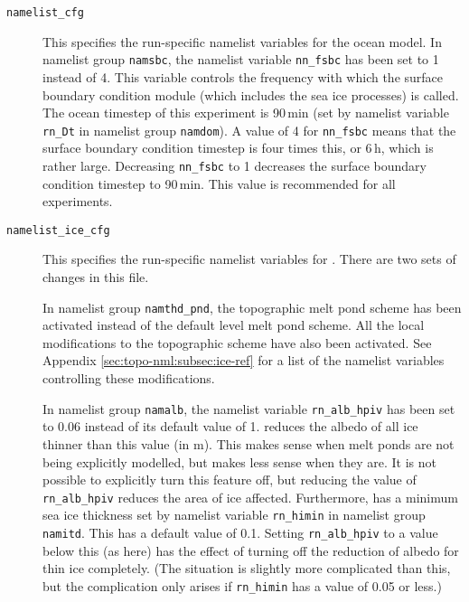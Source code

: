 \begin{description}

    \item[\texttt{namelist\_cfg}]
        This specifies the run-specific namelist variables for the ocean model.
        In namelist group \verb|namsbc|, the namelist variable \verb|nn_fsbc| has been set to 1 instead of 4.
        This variable controls the frequency with which the surface boundary condition module (which includes the sea ice processes) is called.
        The ocean timestep of this experiment is 90\,min (set by namelist variable \verb|rn_Dt| in namelist group \verb|namdom|).
        A value of 4 for \verb|nn_fsbc| means that the surface boundary condition timestep is four times this, or 6\,h, which is rather large.
        Decreasing \verb|nn_fsbc| to 1 decreases the surface boundary condition timestep to 90\,min.
        This value is recommended for all experiments.

    \item[\texttt{namelist\_ice\_cfg}]
        This specifies the run-specific namelist variables for \SIcu{}.
        There are two sets of changes in this file.

        In namelist group \verb|namthd_pnd|, the topographic melt pond scheme has been activated instead of the default level melt pond scheme.
        All the local modifications to the topographic scheme have also been activated.
        See Appendix \ref{sec:topo-nml:subsec:ice-ref} for a list of the namelist variables controlling these modifications.

        In namelist group \verb|namalb|, the namelist variable \verb|rn_alb_hpiv| has been set to 0.06 instead of its default value of 1.
        \SIcu{} reduces the albedo of all ice thinner than this value (in m).
        This makes sense when melt ponds are not being explicitly modelled, but makes less sense when they are.
        It is not possible to explicitly turn this feature off, but reducing the value of \verb|rn_alb_hpiv| reduces the area of ice affected.
        Furthermore, \SIcu{} has a minimum sea ice thickness set by namelist variable \verb|rn_himin| in namelist group \verb|namitd|.
        This has a default value of 0.1.
        Setting \verb|rn_alb_hpiv| to a value below this (as here) has the effect of turning off the reduction of albedo for thin ice completely.
        (The situation is slightly more complicated than this, but the complication only arises if \verb|rn_himin| has a value of 0.05 or less.)


\end{description}
